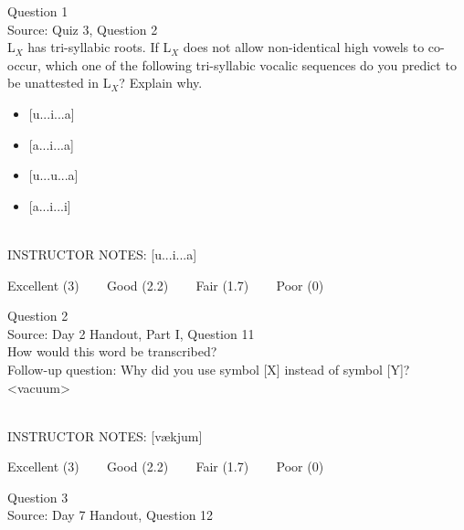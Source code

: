 \documentclass[12pt]{article}
\begin{document}
\begin{center}
\textbf{{\color{blue}{\HUGE START OF EXAM\\}}}

\textbf{{\color{blue}{\HUGE Student ID: 3419\\}}}

\textbf{{\color{blue}{\HUGE 2:15 - 2:30 PM\\}}}

\end{center}
\newpage

{\large Question 1}\\

Source: Quiz 3, Question 2\\

L$_X$ has tri-syllabic roots. If L$_X$ does not allow non-identical high vowels to co-occur, which one of the following tri-syllabic vocalic sequences do you predict to be unattested in L$_X$? Explain why.\\

\begin{itemize} \item {[u...i...a]} \item {[a...i...a]} \item {[u...u...a]} \item {[a...i...i]} \end{itemize}


~\\
INSTRUCTOR NOTES: [u...i...a]


\vfill
Excellent (3) ~~~ Good (2.2) ~~~ Fair (1.7) ~~~ Poor (0)
\newpage

{\large Question 2}\\

Source: Day 2 Handout, Part I, Question 11\\

How would this word be transcribed?\\ Follow-up question: Why did you use symbol [X] instead of symbol [Y]?\\

<vacuum>


~\\
INSTRUCTOR NOTES: [vækjum]


\vfill
Excellent (3) ~~~ Good (2.2) ~~~ Fair (1.7) ~~~ Poor (0)
\newpage

{\large Question 3}\\

Source: Day 7 Handout, Question 12\\
\end{document}
